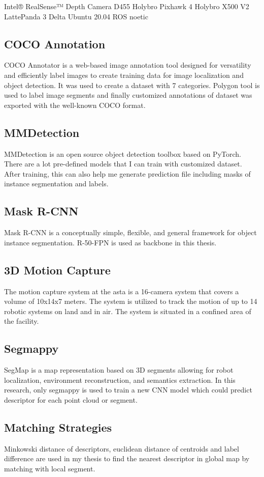 Intel® RealSense™ Depth Camera D455 
Holybro Pixhawk 4 
Holybro X500 V2
LattePanda 3 Delta
Ubuntu 20.04
ROS noetic
\subsection{COCO Annotation}
COCO Annotator is a web-based image annotation tool designed for versatility and efficiently label images to create training data for image localization and object detection\cite{cocoannotator}. It was used to create a dataset with 7 categories. Polygon tool is used to label image segments and finally customized annotations of dataset was exported with the well-known COCO format\cite{mscoco}.
\subsection{MMDetection}
MMDetection is an open source object detection toolbox based on PyTorch\cite{mmdetection}. There are a lot pre-defined models that I can train with customized dataset. After training, this can also help me generate prediction file including masks of instance segmentation and labels.
\subsection{Mask R-CNN}
Mask R-CNN is a conceptually simple, flexible, and general framework for object instance segmentation\cite{he2018mask}. R-50-FPN is used as backbone in this thesis.
\subsection{3D Motion Capture}
The motion capture system at the \acrfull{asta} is a 16-camera system that covers a volume of 10x14x7 meters. The system is utilized to track the motion of up to 14 robotic systems on land and in air. The system is situated in a confined area of the facility.
\subsection{Segmappy}
SegMap is a map representation based on 3D segments allowing for robot localization, environment reconstruction, and semantics extraction\cite{segmap,segmap2,segmatch2017}. In this research, only segmappy is used to train a new CNN model which could predict descriptor for each point cloud or segment.
\subsection{Matching Strategies}
Minkowski distance of descriptors, euclidean distance of centroids and label difference are used in my thesis to find the nearest descriptor in global map by matching with local segment.
